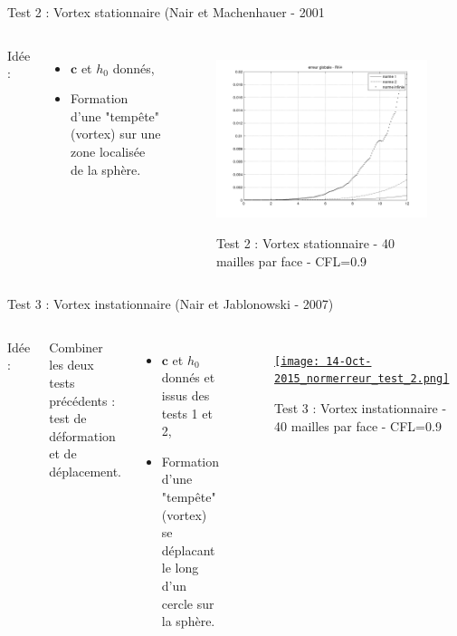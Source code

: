 \documentclass[11pt]{beamer}
\begin{document}
\begin{frame}{Test 2 : Vortex stationnaire (Nair et Machenhauer - 2001}
\begin{columns}
Idée :

\begin{itemize}
\item $\mathbf{c}$ et $h_0$ donnés,

\item Formation d'une "tempête" (vortex) sur une zone localisée de la sphère.
\end{itemize}



\begin{figure}
\href{run:CSapprox_test1.avi}{\includegraphics[scale=0.25]{normerreur_test1_100cfl90.png}} 
\caption{Test 2 : Vortex stationnaire - 40 mailles par face - CFL=0.9}
\end{figure}
\end{columns}
\end{frame}


\begin{frame}{Test 3 : Vortex instationnaire (Nair et Jablonowski - 2007)}
\begin{columns}
Idée :

Combiner les deux tests précédents : test de déformation et de déplacement.
\begin{itemize}

\item $\mathbf{c}$ et $h_0$ donnés et issus des tests 1 et 2,

\item Formation d'une "tempête" (vortex) se déplacant le long d'un cercle sur la sphère.
\end{itemize}



\begin{figure}
\href{run:CSapprox_test2.avi}{\texttt{[image: 14-Oct-2015\_normerreur\_test\_2.png]}} 
\caption{Test 3 : Vortex instationnaire - 40 mailles par face - CFL=0.9}
\end{figure}
\end{columns}
\end{frame}
\end{document}
